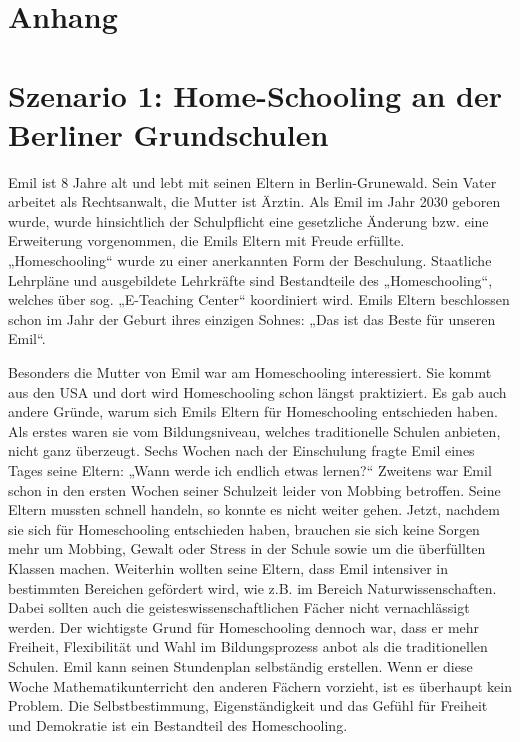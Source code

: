 \documentclass[12pt,a4paper]{article}
\begin{document}
\begin{appendix}
\section*{Anhang}
\normalsize
\section{Szenario 1: Home-Schooling an der Berliner Grundschulen}
Emil ist 8 Jahre alt und lebt mit seinen Eltern in Berlin-Grunewald. Sein Vater arbeitet als Rechtsanwalt, die Mutter ist Ärztin. Als Emil im Jahr 2030 geboren wurde, wurde hinsichtlich der Schulpflicht eine gesetzliche Änderung bzw. eine Erweiterung vorgenommen, die Emils Eltern mit Freude erfüllte. „Homeschooling“ wurde zu einer anerkannten Form der Beschulung. Staatliche Lehrpläne und ausgebildete Lehrkräfte sind Bestandteile des „Homeschooling“, welches über sog. „E-Teaching Center“ koordiniert wird. Emils Eltern beschlossen schon im Jahr der Geburt ihres einzigen Sohnes: „Das ist das Beste für unseren Emil“. 

Besonders die Mutter von Emil war am Homeschooling interessiert. Sie kommt aus den USA und dort wird Homeschooling schon längst praktiziert. Es gab auch andere Gründe, warum sich Emils Eltern für Homeschooling entschieden haben. Als erstes waren sie vom Bildungsniveau, welches traditionelle Schulen anbieten, nicht ganz überzeugt. Sechs Wochen nach der Einschulung fragte Emil eines Tages seine Eltern: „Wann werde ich endlich etwas lernen?“ Zweitens war Emil schon in den ersten Wochen seiner Schulzeit leider von Mobbing betroffen. Seine Eltern mussten schnell handeln, so konnte es nicht weiter gehen. Jetzt, nachdem sie sich für Homeschooling entschieden haben, brauchen sie sich keine Sorgen mehr um Mobbing, Gewalt oder Stress in der Schule sowie um die überfüllten Klassen machen. Weiterhin wollten seine Eltern, dass Emil intensiver in bestimmten Bereichen gefördert wird, wie z.B. im Bereich Naturwissenschaften. Dabei sollten auch die geisteswissenschaftlichen Fächer nicht vernachlässigt werden. Der wichtigste Grund für Homeschooling dennoch war, dass er mehr Freiheit, Flexibilität und Wahl im Bildungsprozess anbot als die traditionellen Schulen. Emil kann seinen Stundenplan selbständig erstellen. Wenn er diese Woche Mathematikunterricht den anderen Fächern vorzieht, ist es überhaupt kein Problem. Die Selbstbestimmung, Eigenständigkeit und das Gefühl für Freiheit und Demokratie ist ein Bestandteil des Homeschooling.


\end{appendix}
\end{document}
